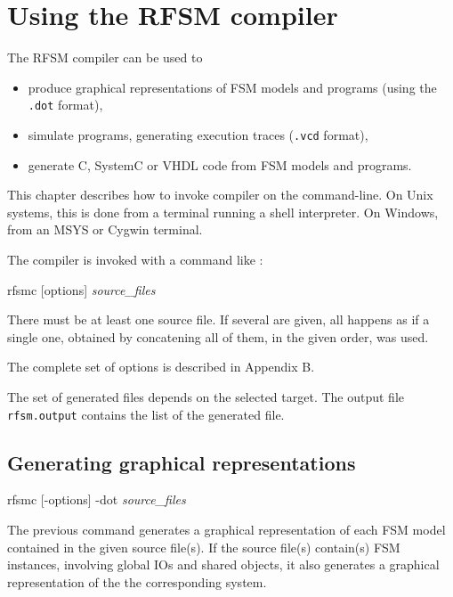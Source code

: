 \chapter{Using the RFSM compiler}
\label{cha:rfsmc}

The RFSM compiler can be used to
\begin{itemize}
\item produce graphical representations of FSM models and programs (using the \verb|.dot| format),
\item simulate programs, generating execution traces (\verb|.vcd| format),
\item generate C, SystemC or VHDL code from FSM models and programs.
\end{itemize}

This chapter describes how to invoke compiler on the command-line. On Unix systems, this is
done from a terminal running a shell interpreter. On Windows, from an MSYS or Cygwin
terminal.

\medskip
The compiler is invoked with a command like :

\begin{FVerbatim}[commandchars=\\\{\}]
rfsmc [options] \emph{source_files}
\end{FVerbatim}

\medskip
There must be at least one source file. If several are given, all happens as if a single one,
obtained by concatening all of them, in the given order, was used. 

\medskip
The complete set of options is described in Appendix B.

\medskip
The set of generated files depends on the selected target. The output file \texttt{rfsm.output}
contains the list of the generated file.

\section{Generating graphical representations}
\label{sec:gener-graph-repr}

\begin{FVerbatim}[commandchars=\\\{\}]
rfsmc [-options] -dot \emph{source_files}
\end{FVerbatim}

The previous command generates a graphical representation of each FSM model 
contained in the given source file(s). If the source file(s) contain(s) FSM instances, involving global IOs
and shared objects, it also generates a graphical representation of the the corresponding system. 

